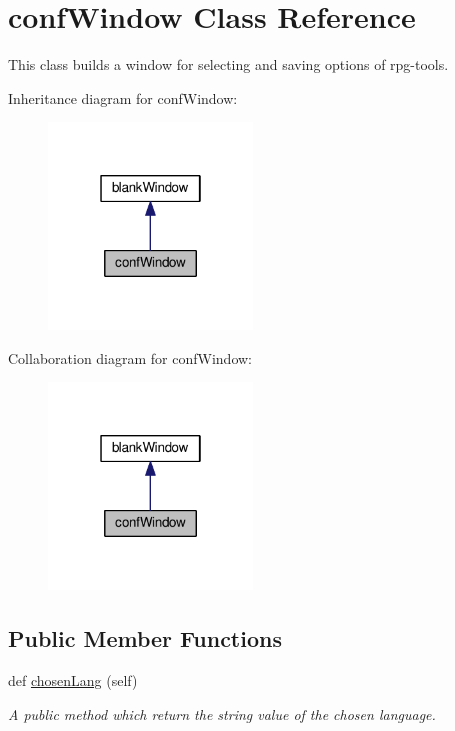\hypertarget{classgui_1_1window_1_1confWindow}{}\section{conf\+Window Class Reference}
\label{classgui_1_1window_1_1confWindow}


This class builds a window for selecting and saving options of rpg-\/tools.  




Inheritance diagram for conf\+Window\+:
\nopagebreak
\begin{figure}[H]
\begin{center}
\leavevmode
\includegraphics[width=154pt]{classgui_1_1window_1_1confWindow__inherit__graph}
\end{center}
\end{figure}


Collaboration diagram for conf\+Window\+:
\nopagebreak
\begin{figure}[H]
\begin{center}
\leavevmode
\includegraphics[width=154pt]{classgui_1_1window_1_1confWindow__coll__graph}
\end{center}
\end{figure}
\subsection*{Public Member Functions}
\begin{DoxyCompactItemize}
\item 
def \hyperlink{classgui_1_1window_1_1confWindow_a355ed316a41bdc8259ac11af5a2556f3}{chosen\+Lang} (self)\hypertarget{classgui_1_1window_1_1confWindow_a355ed316a41bdc8259ac11af5a2556f3}{}\label{classgui_1_1window_1_1confWindow_a355ed316a41bdc8259ac11af5a2556f3}

\begin{DoxyCompactList}\small\item\em A public method which return the string value of the chosen language. \end{DoxyCompactList}\end{DoxyCompactItemize}


